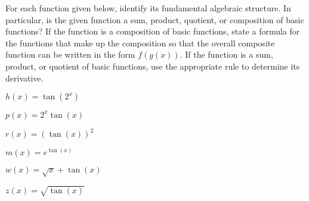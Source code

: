 \begin{pa} \label{PA:2.6}
For each function given below, identify its fundamental algebraic structure.  In particular, is the given function a sum, product, quotient, or composition of basic functions?  If the function is a composition of basic functions, state a formula for the functions that make up the composition so that the overall composite function can be written in the form $f(g(x))$.  If the function is a sum, product, or quotient of basic functions, use the appropriate rule to determine its derivative. 
\bmtwo
\ba
	\item $h(x) = \tan(2^x)$
	\item $p(x) = 2^x \tan(x)$
	\item $r(x) = (\tan(x))^2$
	\item $m(x) = e^{\tan(x)}$
	\item $w(x) = \sqrt{x} + \tan(x)$
	\item $z(x) = \sqrt{\tan(x)}$
\ea
\emtwo
\end{pa} 
\afterpa